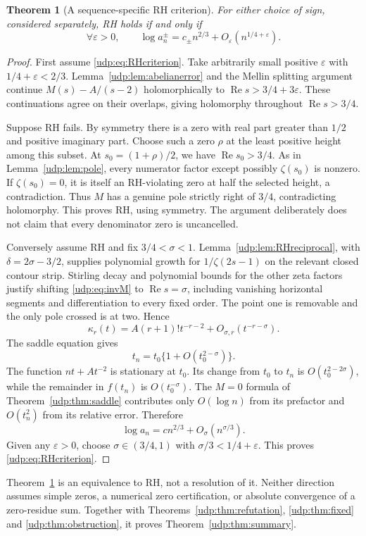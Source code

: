 \documentclass[11pt]{article}
\newtheorem{theorem}{Theorem}[section]
\theoremstyle{remark}\newtheorem{remark}[theorem]{Remark}
\DeclareMathOperator{\Rea}{Re}
\newcommand{\eps}{\varepsilon}
\numberwithin{equation}{section}
\begin{document}
\begin{theorem}[A sequence-specific RH criterion]\label{udp:thm:RH}
For either choice of sign, considered separately, RH holds if and only if
\begin{equation}\label{udp:eq:RHcriterion}
 \forall\eps>0,\qquad
 \log a_n^\pm=c_\pm n^{2/3}+O_\eps(n^{1/4+\eps}).
\end{equation}
\end{theorem}
\begin{proof}
First assume \eqref{udp:eq:RHcriterion}. Take arbitrarily small positive $\eps$ with $1/4+\eps<2/3$. Lemma~\ref{udp:lem:abelianerror} and the Mellin splitting argument continue $M(s)-A/(s-2)$ holomorphically to $\Rea s>3/4+3\eps$. These continuations agree on their overlaps, giving holomorphy throughout $\Rea s>3/4$.

Suppose RH fails. By symmetry there is a zero with real part greater than $1/2$ and positive imaginary part. Choose such a zero $\rho$ at the least positive height among this subset. At $s_0=(1+\rho)/2$, we have $\Rea s_0>3/4$. As in Lemma~\ref{udp:lem:pole}, every numerator factor except possibly $\zeta(s_0)$ is nonzero. If $\zeta(s_0)=0$, it is itself an RH-violating zero at half the selected height, a contradiction. Thus $M$ has a genuine pole strictly right of $3/4$, contradicting holomorphy. This proves RH, using symmetry. The argument deliberately does not claim that every denominator zero is uncancelled.

Conversely assume RH and fix $3/4<\sigma<1$. Lemma~\ref{udp:lem:RHreciprocal}, with $\delta=2\sigma-3/2$, supplies polynomial growth for $1/\zeta(2s-1)$ on the relevant closed contour strip. Stirling decay and polynomial bounds for the other zeta factors justify shifting \eqref{udp:eq:invM} to $\Rea s=\sigma$, including vanishing horizontal segments and differentiation to every fixed order. The point one is removable and the only pole crossed is at two. Hence
\begin{equation}\label{udp:eq:RHderivatives}
 \kappa_r(t)=A(r+1)!t^{-r-2}+O_{\sigma,r}(t^{-r-\sigma}).
\end{equation}
The saddle equation gives
\[
 t_n=t_0\{1+O(t_0^{2-\sigma})\}.
\]
The function $nt+At^{-2}$ is stationary at $t_0$. Its change from $t_0$ to $t_n$ is $O(t_0^{2-2\sigma})$, while the remainder in $f(t_n)$ is $O(t_0^{-\sigma})$. The $M=0$ formula of Theorem~\ref{udp:thm:saddle} contributes only $O(\log n)$ from its prefactor and $O(t_n^2)$ from its relative error. Therefore
\[
 \log a_n=cn^{2/3}+O_\sigma(n^{\sigma/3}).
\]
Given any $\eps>0$, choose $\sigma\in(3/4,1)$ with $\sigma/3<1/4+\eps$. This proves \eqref{udp:eq:RHcriterion}.
\end{proof}
Theorem~\ref{udp:thm:RH} is an equivalence to RH, not a resolution of it. Neither direction assumes simple zeros, a numerical zero certification, or absolute convergence of a zero-residue sum. Together with Theorems~\ref{udp:thm:refutation}, \ref{udp:thm:fixed} and \ref{udp:thm:obstruction}, it proves Theorem~\ref{udp:thm:summary}.
\end{document}
